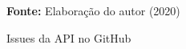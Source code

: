 \begin{figure}[ht!]
\centering

\caption{\textmd{Issues da \gls{API} no GitHub}}
\label{fig:issues}

\par\medskip\textbf{Fonte:} Elaboração do autor (2020) \par\medskip

\end{figure}
